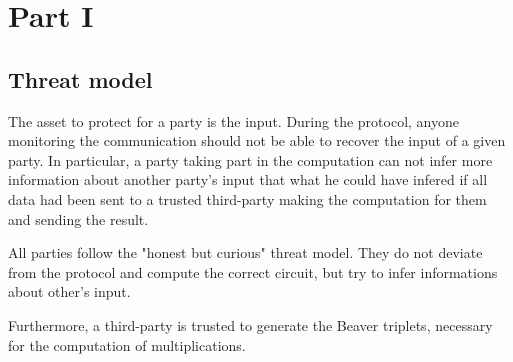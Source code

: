 \documentclass[10pt,conference]{IEEEtran}
\begin{document}
\section{Part I}

\subsection{Threat model}
The asset to protect for a party is the input. During the protocol, anyone monitoring the communication should not be able to recover the input of a given party. In particular, a party taking part in the computation can not infer more information about another party's input that what he could have infered if all data had been sent to a trusted third-party making the computation for them and sending the result.

All parties follow the "honest but curious" threat model. They do not deviate from the protocol and compute the correct circuit, but try to infer informations about other's input.

Furthermore, a third-party is trusted to generate the Beaver triplets, necessary for the computation of multiplications.

\end{document}
